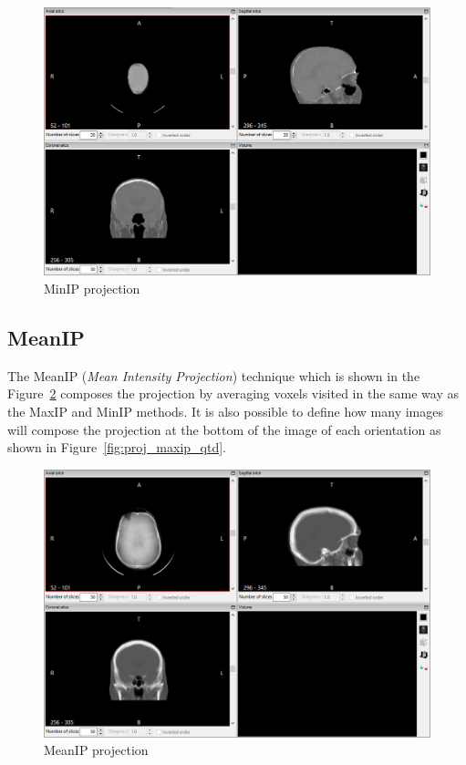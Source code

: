 \begin{figure}[!h]
\centering
\includegraphics[scale=0.40]{../user_guide_figures/invesalius_screen/multiplanar_window_minip_en.png}
\caption{MinIP projection}
\label{fig:proj_minIP}
\end{figure}

\subsection{MeanIP}
The MeanIP (\textit{Mean Intensity Projection}) technique which is shown in the Figure~\ref{fig:proj_meanIP} composes the projection by averaging voxels visited in the same way as the MaxIP and MinIP methods. It is also possible to define how many images will compose the projection at the bottom of the image of each orientation as shown in Figure~\ref{fig:proj_maxip_qtd}.

\begin{figure}[!h]
\centering
\includegraphics[scale=0.40]{../user_guide_figures/invesalius_screen/multiplanar_window_mean_en.png}
\caption{MeanIP projection}
\label{fig:proj_meanIP}
\end{figure}

